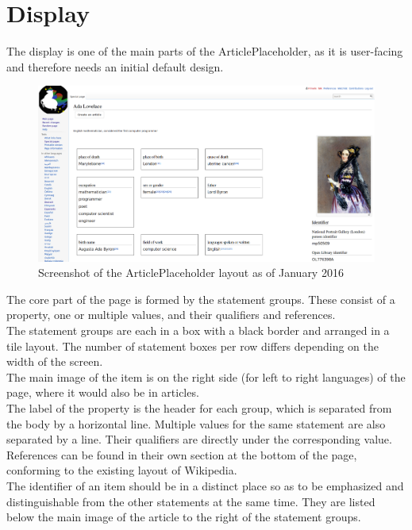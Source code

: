 \section{Display}
	The display is one of the main parts of the ArticlePlaceholder, as it is user-facing and therefore needs an initial default design. \\
	\begin{figure}[H]
		\centering
		\includegraphics[width=\textwidth]{diagrams/Screenshot-ArticlePlaceholder.png}
		\caption{Screenshot of the ArticlePlaceholder layout as of January 2016}
		\label{screenshot}
	\end{figure}
	The core part of the page is formed by the statement groups. These consist of a property, one or multiple values, and their qualifiers and references. \\
	The statement groups are each in a box with a black border and arranged in a tile layout. The number of statement boxes per row differs depending on the width of the screen. \\
	The main image of the item is on the right side (for left to right languages) of the page, where it would also be in articles.\\
	The label of the property is the header for each group, which is separated from the body by a horizontal line. Multiple values for the same statement are also separated by a line. Their qualifiers are directly under the corresponding value. \\
	References can be found in their own section at the bottom of the page, conforming to the existing layout of Wikipedia. \\
	The identifier of an item should be in a distinct place so as to be emphasized and distinguishable from the other statements at the same time. They are listed below the main image of the article to the right of the statement groups.
	
	
	
	
	